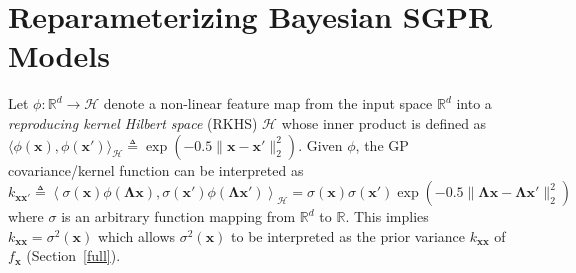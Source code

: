 \documentclass[conference]{IEEEtran}
\begin{document}
\section{Reparameterizing Bayesian SGPR Models}
\label{Seperation of Gaussian Process}%
Let $\phi: \mathbb{R}^d \rightarrow \mathcal{H}$ denote a non-linear feature map from the input space $\mathbb{R}^d$ into a \emph{reproducing kernel Hilbert space} (RKHS) $\mathcal{H}$ whose inner product is defined as $\langle\phi(\mathbf{x}),\phi(\mathbf{x}')\rangle_\mathcal{H} \triangleq \exp(-0.5\|\mathbf{x} - \mathbf{x}'\|_2^2)$. Given $\phi$, the GP covariance/kernel function can be interpreted as $k_{\mathbf{xx'}} \triangleq \left\langle\sigma(\mathbf{x})\phi(\boldsymbol{\Lambda}\mathbf{x}),\sigma(\mathbf{x}')\phi(\mathbf{\Lambda}\mathbf{x}')\right\rangle_\mathcal{H} = \sigma(\mathbf{x})\sigma(\mathbf{x}')\exp(-0.5\|\mathbf{\Lambda x} - \mathbf{\Lambda x}'\|_2^2)$ where $\sigma$ is an arbitrary function mapping from $\mathbb{R}^d$ to $\mathbb{R}$. This implies $k_\mathbf{xx} = \sigma^2(\mathbf{x})$ which allows $\sigma^2(\mathbf{x})$ to be interpreted as the prior variance $k_\mathbf{xx}$ of $f_\mathbf{x}$ (Section~\ref{full}). 
\end{document}
